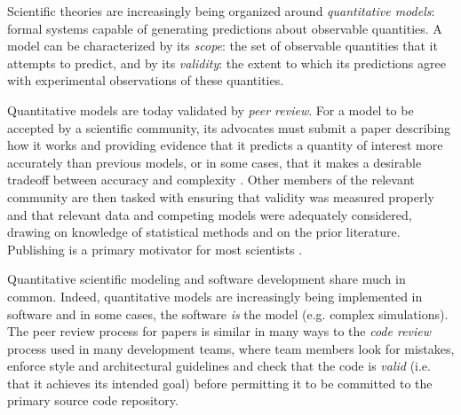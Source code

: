 \documentclass[9pt]{sig-alternate}
\begin{document}
Scientific theories are increasingly being organized around \emph{quantitative models}:  formal systems capable of generating predictions about observable quantities. A model can be  characterized by its \textit{scope}: the set of observable quantities that it attempts to predict, and by its \textit{validity}: the extent to which its predictions agree with experimental observations of these quantities. 

Quantitative models are today validated by \emph{peer review}. For a model to be accepted by a scientific community, its advocates must submit a paper describing how it works and providing evidence that it predicts a quantity of interest more accurately than previous models, or in some cases, that it makes a desirable tradeoff  between accuracy and complexity \cite{box1987empirical}. Other members of the relevant community are then tasked with ensuring that validity was measured properly and that relevant data and competing models were adequately considered, drawing on knowledge of statistical methods and on the prior literature. Publishing is a primary motivator for most scientists \cite{howison2011scientific}.

Quantitative scientific modeling and software development share much in common. Indeed, quantitative models are increasingly being implemented in software and in some cases, the software \emph{is} the model (e.g. complex simulations). The peer review process for papers is similar in many ways to the \emph{code review} process used in many development teams, where team members look for mistakes, enforce style and architectural guidelines and check that the code is \emph{valid} (i.e. that it achieves its intended goal) before permitting it to be committed to the primary source code repository. 
\end{document}
